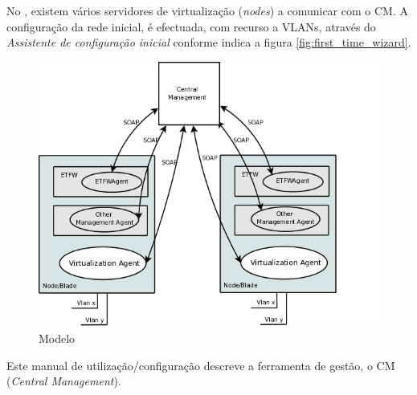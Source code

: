 No \acronym, existem vários servidores de virtualização (\emph{nodes}) a comunicar com o CM. A configuração da rede inicial, é efectuada, com recurso a VLANs, através do \emph{Assistente de configuração inicial} conforme indica a figura \ref{fig:first_time_wizard}.
\begin{figure}[H]
    \begin{center}
	\includegraphics[scale=0.6]{screenshots/etva_enterprise.png}
	\caption{Modelo \acronym}
	\label{fig:etva_enterprise}
	\end{center}
\end{figure}
 
Este manual de utilização/configuração descreve a ferramenta de gestão, o CM (\emph{Central Management}).

\pagebreak
%
